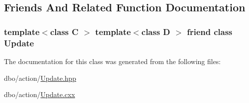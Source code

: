\subsection{Friends And Related Function Documentation}
\hypertarget{classdbo_1_1action_1_1_update_a440e8361659c899ef7f0651ec5ea49e8}{
\subsubsection[{Update}]{\setlength{\rightskip}{0pt plus 5cm}template$<$class C $>$ template$<$class D $>$ friend class {\bf Update}\hspace{0.3cm}{\ttfamily [friend]}}}\label{classdbo_1_1action_1_1_update_a440e8361659c899ef7f0651ec5ea49e8}


The documentation for this class was generated from the following files\+:\begin{DoxyCompactItemize}
\item 
dbo/action/\hyperlink{_update_8hpp}{Update.\+hpp}\item 
dbo/action/\hyperlink{_update_8cxx}{Update.\+cxx}\end{DoxyCompactItemize}
